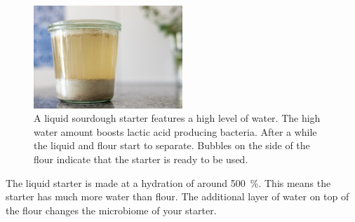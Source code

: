 \begin{figure}[!htb]
\begin{center}
  \includegraphics[width=0.5\textwidth]{sourdough-starter-liquid.jpg}
  \caption[Liquid starter]{A liquid sourdough starter features a high level of
      water. The high water amount boosts lactic acid producing bacteria.
      After a while the liquid and flour start to separate. Bubbles on the
      side of the flour indicate that the starter is ready to be used.}%
  \label{fig:liquid-sourdough-starter}
\end{center}
\end{figure}


\begin{flowchart}[!htb]
\begin{center}
  
  \caption[Converting to a liquid starter]{The process to convert your regular
      or stiff starter into a liquid starter. The whole process takes around 
      3~days. The longer you maintain your starter at the suggested hydration
      level, the more adapted your microorganisms become. It is recommended to
      keep a backup of your original starter as the liquid environment will
      select anaerobic microorganisms. This boosts bacteria that create lactic
      acid rather than acetic acid. The resulting acidity will be perceived as
      milder. When beginning with a liquid starter your stiff starter will
      feature mild dairy notes. When beginning this process with a regular
      starter your created stiff starter will feature both dairy
      and vinegary notes.}%
  \label{flc:liquid-starter-conversion}
\end{center}
\end{flowchart}

The liquid starter is made at a hydration of around \qty{500}{\percent}. This means
the starter has much more water than flour. The additional layer of water on
top of the flour changes the microbiome of your starter.

